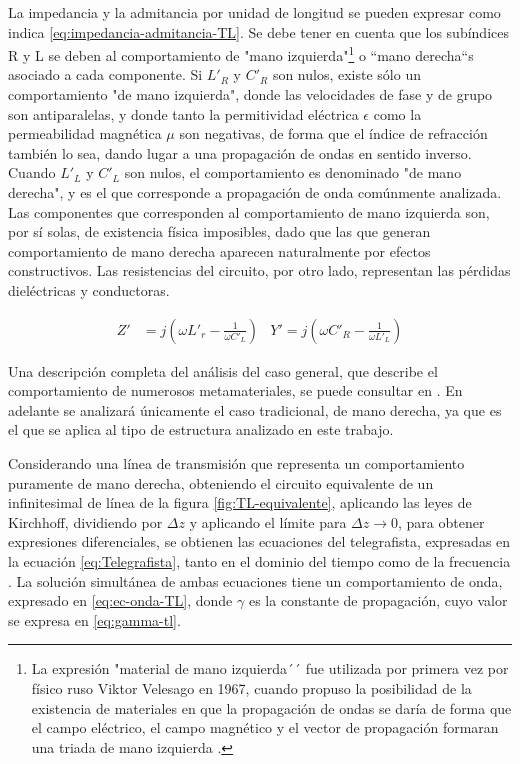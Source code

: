 La impedancia y la admitancia por unidad de longitud se pueden expresar como indica \ref{eq:impedancia-admitancia-TL}. Se debe tener en cuenta que los subíndices R y L se deben al comportamiento de "mano izquierda"\footnote{La expresión "material de mano izquierda´´ fue utilizada por primera vez por físico ruso Viktor Velesago en 1967, cuando propuso la posibilidad de la existencia de materiales en que la propagación de ondas se daría de forma que el campo eléctrico, el campo magnético y el vector de propagación formaran una triada de mano izquierda \cite{Caloz:ElectromagneticMetamaterials}.} o ``mano derecha``s asociado a cada componente. Si $L'_R$ y $C'_R$ son nulos, existe sólo un comportamiento "de mano izquierda", donde las velocidades de fase y de grupo son antiparalelas, y donde tanto la permitividad eléctrica $\epsilon$ como la permeabilidad magnética $\mu$ son negativas, de forma que el índice de refracción también lo sea, dando lugar a una propagación de ondas en sentido inverso. Cuando $L'_L$ y $C'_L$ son nulos, el comportamiento es denominado "de mano derecha", y es el que corresponde a propagación de onda comúnmente analizada. Las componentes que corresponden al comportamiento de mano izquierda son, por sí solas, de existencia física imposibles, dado que las que generan comportamiento de mano derecha aparecen naturalmente por efectos constructivos. Las resistencias del circuito, por otro lado, representan las pérdidas dieléctricas y conductoras.


\begin{align}
\label{eq:impedancia-admitancia-TL}
Z' &= j \left(\omega L'_r - \frac{1}{\omega C'_L} \right) & Y' =j \left(\omega C'_R - \frac{1}{\omega L'_L} \right)
\end{align}

Una descripción completa del análisis del caso general, que describe el comportamiento de numerosos metamateriales, se puede consultar en \cite{Caloz:ElectromagneticMetamaterials}. En adelante se analizará únicamente el caso tradicional, de mano derecha, ya que es el que se aplica al tipo de estructura analizado en este trabajo.

Considerando una línea de transmisión que representa un comportamiento puramente de mano derecha, obteniendo el circuito equivalente de un infinitesimal de línea de la figura \ref{fig:TL-equivalente}, aplicando las leyes de Kirchhoff, dividiendo por $\Delta z$ y aplicando el límite para $\Delta z \rightarrow 0$, para obtener expresiones diferenciales, se obtienen las ecuaciones del telegrafista, expresadas en la ecuación \ref{eq:Telegrafista}, tanto en el dominio del tiempo como de la frecuencia \cite{Fernandez:Electromag}. La solución simultánea de ambas ecuaciones tiene un comportamiento de onda, expresado en \ref{eq:ec-onda-TL}, donde $\gamma$ es la constante de propagación, cuyo valor se expresa en \ref{eq:gamma-tl}.

